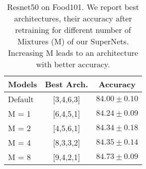 \begin{wraptable}{R}{0.5\textwidth}
 \vspace{-0.5cm}
    \caption{Resnet50 on Food101. We report best architectures, their accuracy after retraining for different number of Mixtures (M) of our SuperNets. Increasing M leads to an architecture with better accuracy. }
    \begin{center}
    \footnotesize
    \vspace{-0.5cm}
        \begin{tabular}{ l | c c }
            Models &  Best Arch. & Accuracy   \\%
             \hline
             \hline
              Default  & [3,4,6,3] & $84.00 \pm 0.10 $ \\ %
             \hline
              M = 1   & [6,4,5,1] & $ 84.24 \pm 0.09 $  \\ %
             \hline
              M = 2  & [4,5,6,1] & $84.34 \pm 0.18 $ \\ %
             \hline
             M = 4  & [8,3,3,2] & $84.35 \pm 0.14 $ \\ %
             \hline
             M = 8   & [9,4,2,1] & $84.73 \pm 0.09 $ \\ %
        \end{tabular}           
    \label{food}
    \vspace{-0.6cm}
    \end{center}
\end{wraptable}
